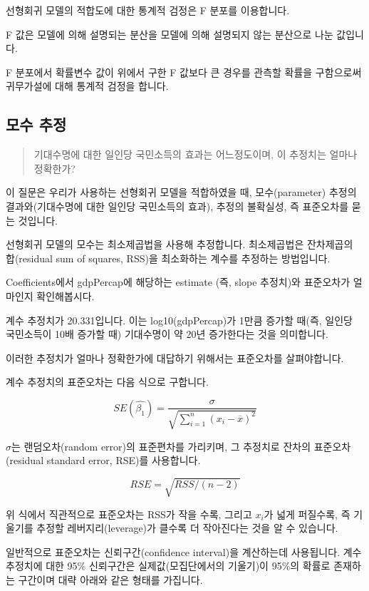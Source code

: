 \documentclass[
  letterpaper,
  DIV=11,
  numbers=noendperiod]{scrartcl}
\begin{document}
선형회귀 모델의 적합도에 대한 통계적 검정은 F 분포를 이용합니다.

F 값은 모델에 의해 설명되는 분산을 모델에 의해 설명되지 않는 분산으로
나눈 값입니다.

F 분포에서 확률변수 값이 위에서 구한 F 값보다 큰 경우를 관측할 확률을
구함으로써 귀무가설에 대해 통계적 검정을 합니다.

\hypertarget{uxbaa8uxc218-uxcd94uxc815}{%
\subsection{모수 추정}\label{uxbaa8uxc218-uxcd94uxc815}}

\begin{quote}
기대수명에 대한 일인당 국민소득의 효과는 어느정도이며, 이 추정치는
얼마나 정확한가?
\end{quote}

이 질문은 우리가 사용하는 선형회귀 모델을 적합하였을 때, 모수(parameter)
추정의 결과와(기대수명에 대한 일인당 국민소득의 효과), 추정의 불확실성,
즉 표준오차를 묻는 것입니다.

선형회귀 모델의 모수는 최소제곱법을 사용해 추정합니다. 최소제곱법은
잔차제곱의 합(residual sum of squares, RSS)을 최소화하는 계수를 추정하는
방법입니다.

Coefficients에서 gdpPercap에 해당하는 estimate (즉, slope 추정치)와
표준오차가 얼마인지 확인해봅시다.

계수 추정치가 20.331입니다. 이는 log10(gdpPercap)가 1만큼 증가할 때(즉,
일인당 국민소득이 10배 증가할 때) 기대수명이 약 20년 증가한다는 것을
의미합니다.

이러한 추정치가 얼마나 정확한가에 대답하기 위해서는 표준오차를
살펴야합니다.

계수 추정치의 표준오차는 다음 식으로 구합니다.

\[SE(\hat{\beta_1}) = \frac{\sigma}{\sqrt{\sum_{i=1}^{n}{(x_i-\overline{x})^2}}}\]

\(\sigma\)는 랜덤오차(random error)의 표준편차를 가리키며, 그 추정치로
잔차의 표준오차(residual standard error, RSE)를 사용합니다.

\[RSE = \sqrt{RSS/(n-2)}\]

위 식에서 직관적으로 표준오차는 RSS가 작을 수록, 그리고 \(x_i\)가 넓게
퍼질수록, 즉 기울기를 추정할 레버지리(leverage)가 클수록 더 작아진다는
것을 알 수 있습니다.

일반적으로 표준오차는 신뢰구간(confidence interval)을 계산하는데
사용됩니다. 계수 추정치에 대한 95\% 신뢰구간은 실제값(모집단에서의
기울기)이 95\%의 확률로 존재하는 구간이며 대략 아래와 같은 형태를
가집니다.
\end{document}
